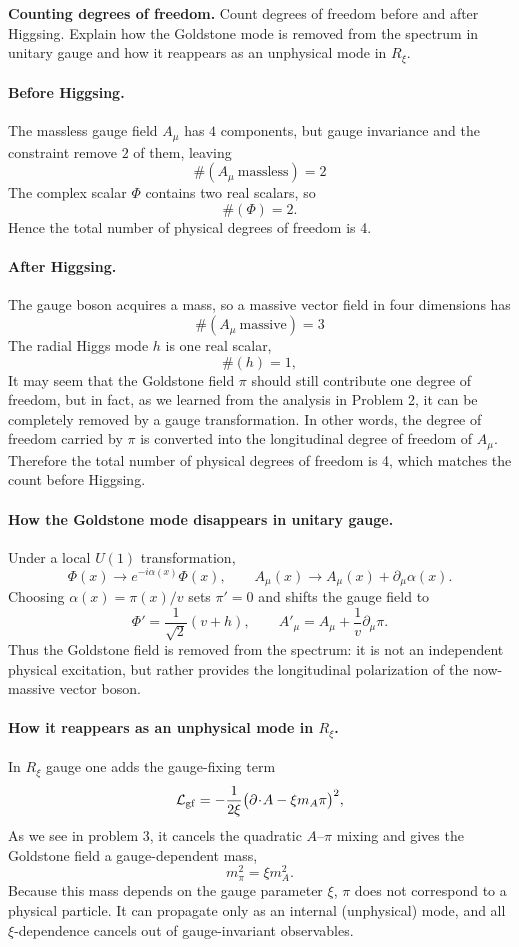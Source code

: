 \begin{problem}
    \textbf{Counting degrees of freedom.} Count degrees of freedom before and after Higgsing. Explain how the Goldstone mode is removed from the spectrum in unitary gauge and how it reappears as an unphysical mode in \(R_\xi\).
\end{problem}
\begin{solution}[23.7]
	\paragraph{Before Higgsing.}
	The massless gauge field $A_\mu$ has $4$ components, but gauge invariance and the constraint remove $2$ of them, leaving
	\[
	\# (A_\mu\ \text{massless})=2
	\]
   The complex scalar $\Phi$ contains two real scalars, so
	\[
	\#(\Phi)=2.
	\]
	Hence the total number of physical degrees of freedom is 4.
	\paragraph{After Higgsing.}
	The gauge boson acquires a mass, so a massive vector field in four dimensions has
	\[
\# (A_\mu\ \text{massive})=3
	\]
   The radial Higgs mode $h$ is one real scalar,
	\[
	\# (h)=1,
	\]
	It may seem that the Goldstone field $\pi$ should still contribute one degree of freedom, but in fact, as we learned from the analysis in Problem 2, it can be completely removed by a gauge transformation. In other words, the degree of freedom carried by $\pi$ is converted into the longitudinal degree of freedom of $A_\mu$.
	Therefore the total number of physical degrees of freedom is 4, which matches the count before Higgsing.
	
	\paragraph{How the Goldstone mode disappears in unitary gauge.}
	Under a local $U(1)$ transformation,
	\[
	\Phi(x)\to e^{-i\alpha(x)}\Phi(x),\qquad A_\mu(x)\to A_\mu(x)+\partial_\mu\alpha(x).
	\]
	Choosing $\alpha(x)=\pi(x)/v$ sets $\pi'=0$ and shifts the gauge field to
	\[
	\Phi'=\frac{1}{\sqrt2}(v+h),\qquad A'_\mu=A_\mu+\frac{1}{v}\partial_\mu\pi.
	\]
	Thus the Goldstone field is removed from the spectrum: it is not an independent physical excitation, but rather provides the longitudinal polarization of the now-massive vector boson.
	
	\paragraph{How it reappears as an unphysical mode in $R_\xi$.}
	In $R_\xi$ gauge one adds the gauge-fixing term
	\[
	\mathcal L_{\rm gf}=-\frac{1}{2\xi}\bigl(\partial\!\cdot\!A-\xi m_A\pi\bigr)^2,
	\]
	As we see in problem 3, it cancels the quadratic $A$--$\pi$ mixing and gives the Goldstone field a gauge-dependent mass,
	\[
	m_\pi^2=\xi m_A^2.
	\]
	Because this mass depends on the gauge parameter $\xi$, $\pi$ does not correspond to a physical particle. It can propagate only as an internal (unphysical) mode, and all $\xi$-dependence cancels out of gauge-invariant observables.
\end{solution}